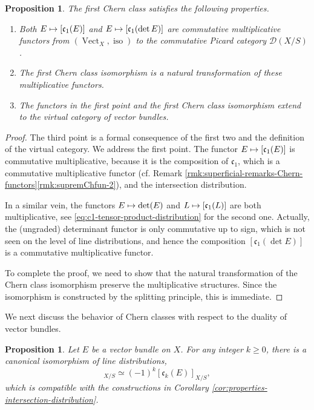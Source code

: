 \documentclass[11pt]{article}
\newcommand{\cf}{cf.\xspace}
\newcommand\mto{\mathchoice{\longmapsto}{\mapsto}{\mapsto}{\mapsto}}
\theoremstyle{plain}
\newtheorem{proposition}[theorem]{Proposition}
\theoremstyle{definition}
\newcommand{\Dcal}{\mathcal D}
\newcommand{\cfrak}{\mathfrak c}
\DeclareMathOperator{\iso}{iso}
\DeclareMathOperator{\Vect}{Vect}
\begin{document}
\begin{proposition}\label{prop:isom-first-chern-functorial}
The first Chern class satisfies the following properties.

\begin{enumerate}
\item Both $E\mto [\cfrak_{1}(E)]$ and $E\mto [\cfrak_{1}(\det E)]$ are commutative multiplicative functors from $(\Vect_{X},\iso)$ to the commutative Picard category $\Dcal(X/S)$.
\item The first Chern class isomorphism is a natural transformation of these multiplicative functors.
\item The functors in the first point and the first Chern class isomorphism extend to the virtual category of vector bundles.
\end{enumerate}
\end{proposition}

\begin{proof}
The third point is a formal consequence of the first two and the definition of the virtual category. We address the first point. The functor $E\mto [\cfrak_{1}(E)]$ is commutative multiplicative, because it is the composition of $\cfrak_{1}$, which is a commutative multiplicative functor (\cf Remark \ref{rmk:superficial-remarks-Chern-functors}\eqref{rmk:supremChfun-2}), and the intersection distribution.

In a similar vein, the functors $E \mto \det (E)$ and $L \mto [\cfrak_1(L)]$ are both multiplicative, see \eqref{eq:c1-tensor-product-distribution} for the second one. Actually, the (ungraded) determinant functor is only commutative up to sign, which is not seen on the level of line distributions, and hence the composition $[\cfrak_1(\det E)]$ is a commutative multiplicative functor.

To complete the proof, we need to show that the natural transformation of the Chern class isomorphism preserve the multiplicative structures. Since the isomorphism is constructed by the splitting principle, this is immediate.
\end{proof}

We next discuss the behavior of Chern classes with respect to the duality of vector bundles.

\begin{proposition} \label{prop:Cherndual}
Let $E$ be a vector bundle on $X$. For any integer $k\geq 0$, there is a canonical isomorphism of line distributions,
\begin{displaymath}
[\cfrak_k(E^\vee)]_{X/S} \simeq {(-1)^k} [ \cfrak_k(E) ]_{X/S},
\end{displaymath}
which is compatible with the constructions in Corollary \ref{cor:properties-intersection-distribution}.
\end{proposition}
\end{document}
